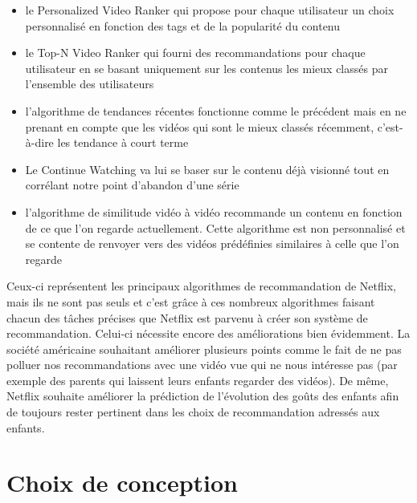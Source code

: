 \documentclass[light]{ceri}
\begin{document}
\begin{itemize}
    \item le Personalized Video Ranker qui propose pour chaque utilisateur un choix personnalisé en fonction des tags et de la popularité du contenu
    \item le Top-N Video Ranker qui fourni des recommandations pour chaque utilisateur en se basant uniquement sur les contenus les mieux classés par l'ensemble des utilisateurs
    \item l'algorithme de tendances récentes fonctionne comme le précédent mais en ne prenant en compte que les vidéos qui sont le mieux classés récemment, c'est-à-dire les tendance à court terme
    \item Le Continue Watching va lui se baser sur le contenu déjà visionné tout en corrélant notre point d'abandon d'une série
    \item l'algorithme de similitude vidéo à vidéo recommande un contenu en fonction de ce que l'on regarde actuellement. Cette algorithme est non personnalisé et se contente de renvoyer vers des vidéos prédéfinies similaires à celle que l'on regarde
\end{itemize}
Ceux-ci représentent les principaux algorithmes de recommandation de Netflix, mais ils ne sont pas seuls et c'est grâce à ces nombreux algorithmes faisant chacun des tâches précises que Netflix est parvenu à créer son système de recommandation. Celui-ci nécessite encore des améliorations bien évidemment. La société américaine souhaitant améliorer plusieurs points comme le fait de ne pas polluer nos recommandations avec une vidéo vue qui ne nous intéresse pas (par exemple des parents qui laissent leurs enfants regarder des vidéos). De même, Netflix souhaite améliorer la prédiction de l'évolution des goûts des enfants afin de toujours rester pertinent dans les choix de recommandation adressés aux enfants. 

\section{Choix de conception}
\end{document}
